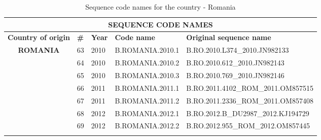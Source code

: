 \begin{table}[htbp]
    \caption{Sequence code names for the country - Romania}
    \centering
\begin{tabular}{|cllll|}
\hline
\multicolumn{5}{|c|}{\textbf{SEQUENCE   CODE NAMES}}                                                                                                                                                            \\ \hline
\multicolumn{1}{|l|}{\textbf{Country   of origin}}       & \multicolumn{1}{l|}{\textbf{\#}} & \multicolumn{1}{r|}{\textbf{Year}} & \multicolumn{1}{l|}{\textbf{Code name}} & \textbf{Original sequence name}    \\ \hline
\multicolumn{1}{|c|}{\multirow{17}{*}{\textbf{ROMANIA}}} & \multicolumn{1}{l|}{63}          & \multicolumn{1}{l|}{2010}          & \multicolumn{1}{l|}{B.ROMANIA.2010.1}   & B.RO.2010.L374\_2010.JN982133      \\ \cline{2-5} 
\multicolumn{1}{|c|}{}                                   & \multicolumn{1}{l|}{64}          & \multicolumn{1}{l|}{2010}          & \multicolumn{1}{l|}{B.ROMANIA.2010.2}   & B.RO.2010.612\_2010.JN982143       \\ \cline{2-5} 
\multicolumn{1}{|c|}{}                                   & \multicolumn{1}{l|}{65}          & \multicolumn{1}{l|}{2010}          & \multicolumn{1}{l|}{B.ROMANIA.2010.3}   & B.RO.2010.769\_2010.JN982146       \\ \cline{2-5} 
\multicolumn{1}{|c|}{}                                   & \multicolumn{1}{l|}{66}          & \multicolumn{1}{l|}{2011}          & \multicolumn{1}{l|}{B.ROMANIA.2011.1}   & B.RO.2011.4102\_ROM\_2011.OM857515 \\ \cline{2-5} 
\multicolumn{1}{|c|}{}                                   & \multicolumn{1}{l|}{67}          & \multicolumn{1}{l|}{2011}          & \multicolumn{1}{l|}{B.ROMANIA.2011.2}   & B.RO.2011.2336\_ROM\_2011.OM857408 \\ \cline{2-5} 
\multicolumn{1}{|c|}{}                                   & \multicolumn{1}{l|}{68}          & \multicolumn{1}{l|}{2012}          & \multicolumn{1}{l|}{B.ROMANIA.2012.1}   & B.RO.2012.B\_DU2987\_2012.KJ194729 \\ \cline{2-5} 
\multicolumn{1}{|c|}{}                                   & \multicolumn{1}{l|}{69}          & \multicolumn{1}{l|}{2012}          & \multicolumn{1}{l|}{B.ROMANIA.2012.2}   & B.RO.2012.955\_ROM\_2012.OM857445  \\ \cline{2-5} 

\end{tabular}
\end{table}
